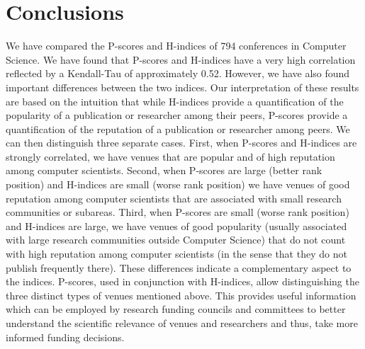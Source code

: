 \documentclass[notitlepage]{svjour3}
\begin{document}
\section{Conclusions}
\label{sec:conclusions}

We have compared the P-scores and H-indices of 794 conferences in Computer Science. 
We have found that P-scores and H-indices have a very high correlation reflected by a Kendall-Tau of 
approximately 0.52. However,
we have also found important differences between the two indices.
Our interpretation of these results are based on the intuition that while H-indices provide a quantification of the popularity of a publication or researcher among their peers, P-scores provide a quantification of the reputation of a publication or researcher among peers. We can then distinguish three separate cases. First, when P-scores and H-indices are strongly correlated, we have venues that are popular and of high reputation among computer scientists. Second, when P-scores are large (better rank position) and H-indices are small (worse rank position) we have venues of good reputation among computer scientists that are associated with small research communities or subareas. Third, when P-scores are small (worse rank position) and H-indices are large, we have venues of good popularity (usually associated with large research communities outside Computer Science) that do not count with high reputation among computer scientists (in the sense that they do not publish frequently there).
These differences indicate a complementary aspect to the indices. P-scores, used in conjunction with H-indices, allow distinguishing the three distinct types of venues mentioned above. This provides useful information which
can be employed
by research funding councils and committees to better understand 
the scientific relevance of venues and researchers and thus, take more informed funding decisions.



\end{document}
